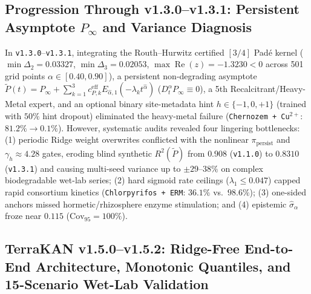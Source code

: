 \documentclass[10pt,twocolumn,a4paper]{article}
\begin{document}
\subsection{Progression Through v1.3.0--v1.3.1: Persistent Asymptote $P_\infty$ and Variance Diagnosis}

In \texttt{v1.3.0}--\texttt{v1.3.1}, integrating the Routh--Hurwitz certified $[3/4]$ Pad\'e kernel ($\min \Delta_2 = 0.03327$, $\min \Delta_3 = 0.02053$, $\max \operatorname{Re}(z) = -1.3230 < 0$ across 501 grid points $\alpha \in [0.40,0.90]$), a persistent non-degrading asymptote $\tilde{P}(t) = P_\infty + \sum_{k=1}^3 c_{P,k}^{\text{eff}} E_{\hat{\alpha},1}(-\lambda_k t^{\hat{\alpha}})$ ($D_t^\alpha P_\infty \equiv 0$), a 5th Recalcitrant/Heavy-Metal expert, and an optional binary site-metadata hint $h \in \{-1,0,+1\}$ (trained with $50\%$ hint dropout) eliminated the heavy-metal failure (\texttt{Chernozem + Cu$^{2+}$}: $81.2\% \to 0.1\%$). However, systematic audits revealed four lingering bottlenecks: (1) periodic Ridge weight overwrites conflicted with the nonlinear $\pi_{\text{persist}}$ and $\gamma_h \approx 4.28$ gates, eroding blind synthetic $R^2(\tilde{P})$ from $0.908$ (\texttt{v1.1.0}) to $0.8310$ (\texttt{v1.3.1}) and causing multi-seed variance up to $\pm 29\text{--}38\%$ on complex biodegradable wet-lab series; (2) hard sigmoid rate ceilings ($\lambda_1 \le 0.047$) capped rapid consortium kinetics (\texttt{Chlorpyrifos + ERM}: $36.1\%$ vs.\ $98.6\%$); (3) one-sided anchors missed hormetic/rhizosphere enzyme stimulation; and (4) epistemic $\hat{\sigma}_\alpha$ froze near $0.115$ ($\text{Cov}_{95} = 100\%$).

\subsection{TerraKAN v1.5.0--v1.5.2: Ridge-Free End-to-End Architecture, Monotonic Quantiles, and 15-Scenario Wet-Lab Validation}
\end{document}
